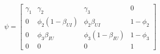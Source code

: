 \documentclass[10pt]{article}
\begin{document}
\[
\psi = 
\left[\begin{array}
{cccc}
\gamma_{1} & \gamma_{2} & \gamma_{3} & 0 \\
0 & \phi_{2}(1 - \beta_{UI}) & \phi_{2}\beta_{UI} & 1 - \phi_{2} \\
0 & \phi_{3}\beta_{IU} & \phi_{3}(1 - \beta_{IU}) & 1 - \phi_{3} \\
0 & 0 & 0 & 1
\end{array}\right]
\]
\end{document}
